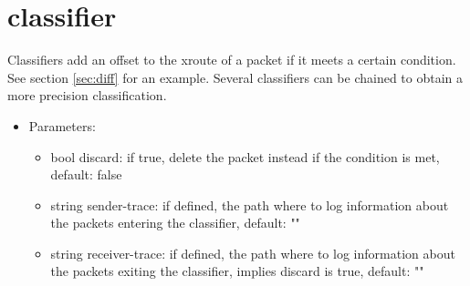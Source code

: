 \section{classifier}
Classifiers add an offset to the xroute of a packet if it meets a certain condition. See section \ref{sec:diff} for an example. Several classifiers can be chained to obtain a more precision classification.
\begin{itemize}
\item Parameters:
\begin{itemize}
\item bool discard: if true, delete the packet instead if the condition is met, default: false
\item string sender-trace: if defined, the path where to log information about the packets entering the classifier, default: ""
\item string receiver-trace: if defined, the path where to log information about the packets exiting the classifier, implies discard is true, default: ""
\end{itemize}
\end{itemize}
